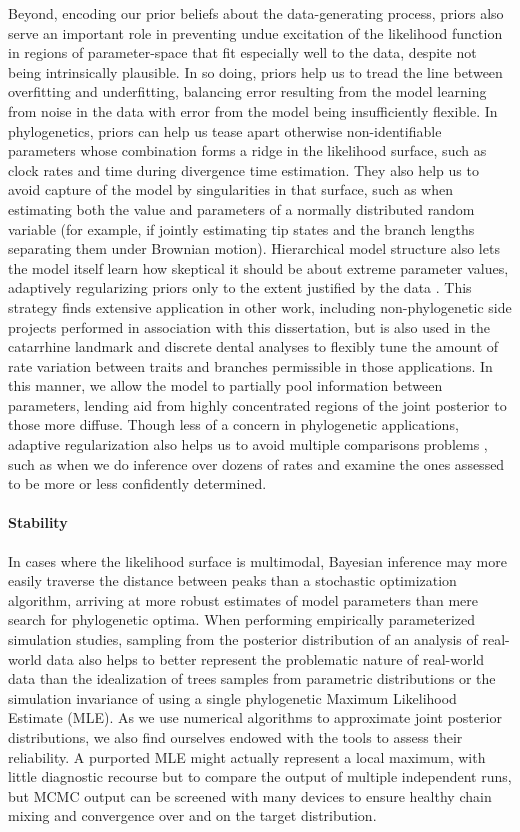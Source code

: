 Beyond, encoding our prior beliefs about the data-generating process, priors also serve an important role in preventing undue excitation of the likelihood function in regions of parameter-space that fit especially well to the data, despite not being intrinsically plausible. In so doing, priors help us to tread the line between overfitting and underfitting, balancing error resulting from the model learning from noise in the data with error from the model being insufficiently flexible. In phylogenetics, priors can help us tease apart otherwise non-identifiable parameters whose combination forms a ridge in the likelihood surface, such as clock rates and time during divergence time estimation. They also help us to avoid capture of the model by singularities in that surface, such as when estimating both the value and parameters of a normally distributed random variable (for example, if jointly estimating tip states and the branch lengths separating them under Brownian motion). Hierarchical model structure also lets the model itself learn how skeptical it should be about extreme parameter values, adaptively regularizing priors only to the extent justified by the data \citep{gelmanWhyWeUsually2012}. This strategy finds extensive application in other work, including non-phylogenetic side projects performed in association with this dissertation, but is also used in the catarrhine landmark and discrete dental analyses to flexibly tune the amount of rate variation between traits and branches permissible in those applications. In this manner, we allow the model to partially pool information between parameters, lending aid from highly concentrated regions of the joint posterior to those more diffuse. Though less of a concern in phylogenetic applications, adaptive regularization also helps us to avoid multiple comparisons problems \citep{gelmanWhyWeUsually2012}, such as when we do inference over dozens of rates and examine the ones assessed to be more or less confidently determined.

\paragraph{Stability}

In cases where the likelihood surface is multimodal, Bayesian inference may more easily traverse the distance between peaks than a stochastic optimization algorithm, arriving at more robust estimates of model parameters than mere search for phylogenetic optima. When performing empirically parameterized simulation studies, sampling from the posterior distribution of an analysis of real-world data also helps to better represent the problematic nature of real-world data than the idealization of trees samples from parametric distributions or the simulation invariance of using a single phylogenetic Maximum Likelihood Estimate (MLE). As we use numerical algorithms to approximate joint posterior distributions, we also find ourselves endowed with the tools to assess their reliability. A purported MLE might actually represent a local maximum, with little diagnostic recourse but to compare the output of multiple independent runs, but MCMC output can be screened with many devices to ensure healthy chain mixing and convergence over and on the target distribution.

